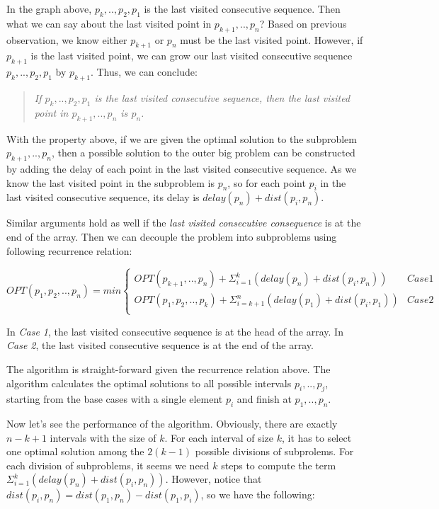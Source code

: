 In the graph above, $p_k, .., p_2, p_1$ is the last visited consecutive sequence. Then what we can say about the last visited point in $p_{k+1}, .., p_n$? Based on previous observation, we know either $p_{k+1}$ or $p_n$ must be the last visited point. However, if $p_{k+1}$ is the last visited point, we can grow our last visited consecutive sequence $p_k, .., p_2, p_1$ by $p_{k+1}$. Thus, we can conclude:

\begin{quote}
\textit{If $p_k, .., p_2, p_1$ is the last visited consecutive sequence, then the last visited point in $p_{k+1}, .., p_n$ is $p_n$.}
\end{quote}

With the property above, if we are given the optimal solution to the subproblem $p_{k+1}, .., p_n$, then a possible solution to the outer big problem can be constructed by adding the delay of each point in the last visited consecutive sequence. As we know the last visited point in the subproblem is $p_n$, so for each point $p_i$ in the last visited consecutive sequence, its delay is $delay(p_n) + dist(p_i, p_n)$.

Similar arguments hold as well if the \textit{last visited consecutive consequence} is at the end of the array. Then we can decouple the problem into subproblems using following recurrence relation:

\[
OPT(p_1, p_2, .., p_n) = min \left\{
  \begin{array}{ll}
    OPT(p_{k+1}, .., p_n) + \Sigma_{i=1}^{k}(delay(p_n) + dist(p_i, p_n)) & Case 1 \\
    OPT(p_1, p_2, .., p_k) + \Sigma_{i=k+1}^{n}(delay(p_1) + dist(p_i, p_1)) & Case 2 \\
  \end{array}\right.
\]

In \textit{Case 1}, the last visited consecutive sequence is at the head of the array. In \textit{Case 2}, the last visited consecutive sequence is at the end of the array.

The algorithm is straight-forward given the recurrence relation above. The algorithm
calculates the optimal solutions to all possible intervals $p_i, .., p_j$, starting from the base cases
with a single element $p_i$ and finish at $p_1, .., p_n$.

Now let's see the performance of the algorithm. Obviously, there are exactly $n - k + 1$ intervals with the size of $k$. For each interval of size $k$, it has to select one optimal solution among the $2(k-1)$ possible divisions of subprolems. For each division of subproblems, it seems we need $k$ steps to compute the term $\Sigma_{i=1}^{k}(delay(p_n) + dist(p_i, p_n))$. However, notice that $dist(p_i, p_n) = dist(p_1, p_n) - dist(p_1, p_i)$, so we have the following:

